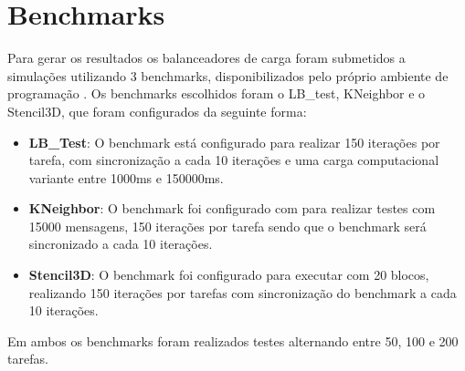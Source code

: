 \section{Benchmarks}
Para gerar os resultados os balanceadores de carga foram submetidos a simulações utilizando 3 benchmarks, disponibilizados pelo próprio ambiente de programação \charm. Os benchmarks escolhidos foram o LB\_test, KNeighbor e o Stencil3D, que foram configurados da seguinte forma:
\begin{itemize}
	\item \textbf{LB\_Test}: O benchmark está configurado para realizar 150 iterações por tarefa, com sincronização a cada 10 iterações e uma carga computacional variante entre 1000ms e 150000ms.
	
	\item \textbf{KNeighbor}: O benchmark foi configurado com para realizar testes com 15000 mensagens, 150 iterações por tarefa sendo que o benchmark será sincronizado a cada 10 iterações.
	
	\item \textbf{Stencil3D}: O benchmark foi configurado para executar com 20 blocos, realizando 150 iterações por tarefas com sincronização do benchmark a cada 10 iterações.
\end{itemize} 

Em ambos os benchmarks foram realizados testes alternando entre 50, 100 e 200 tarefas.
